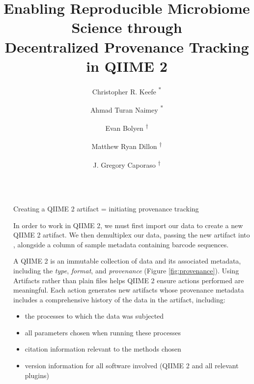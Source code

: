 \documentclass[final]{beamer}
\title{Enabling Reproducible Microbiome Science through \\ Decentralized Provenance Tracking in QIIME 2}
\author{Christopher R. Keefe \textsuperscript{*} \and Ahmad Turan Naimey \textsuperscript{*} \and Evan Bolyen \textsuperscript{†} \and Matthew Ryan Dillon \textsuperscript{†} \and J. Gregory Caporaso \textsuperscript{†} }
\institute[shortinst]{The Pathogen and Microbiome Institute at Northern Arizona University \\
{\footnotesize \textsuperscript{*} Equal Contributors \hskip .5cm \textsuperscript{†} Advisors} }
\newlength{\sepwidth}
\newlength{\colwidth}
\newcommand{\separatorcolumn}{\begin{column}{\sepwidth}\end{column}}
\begin{document}
\begin{frame}[t]
\begin{columns}[t]
\separatorcolumn

\begin{column}{\colwidth}


  \begin{block}{Creating a QIIME 2 artifact = initiating provenance tracking}

   In order to work in QIIME 2, we must first import our data to create a new
   QIIME 2 artifact. We then demultiplex our data, passing the new artifact
   into , alongside a column of sample metadata containing
   barcode sequences.

   \begin{tcolorbox}
   [width=\textwidth, colframe=blue]
   {A QIIME 2  is an immutable collection of data and its associated
           metadata, including the \textit{type}, \textit{format}, and \textit{provenance} (Figure \ref{fig:provenance}).
   Using Artifacts rather than plain files helps QIIME 2 ensure actions
   performed are meaningful. Each action generates new artifacts whose
   provenance metadata includes a comprehensive history of the data in the
   artifact, including:}
    \begin{itemize}
      \item {the processes to which the data was subjected}
      \item {all parameters chosen when running these processes}
      \item {citation information relevant to the methods chosen}
      \item {version information for all software involved (QIIME 2 and all relevant plugins)}
    \end{itemize}
    \end{tcolorbox}
  \end{block}


\end{column}
\end{columns}
\end{frame}
\end{document}
